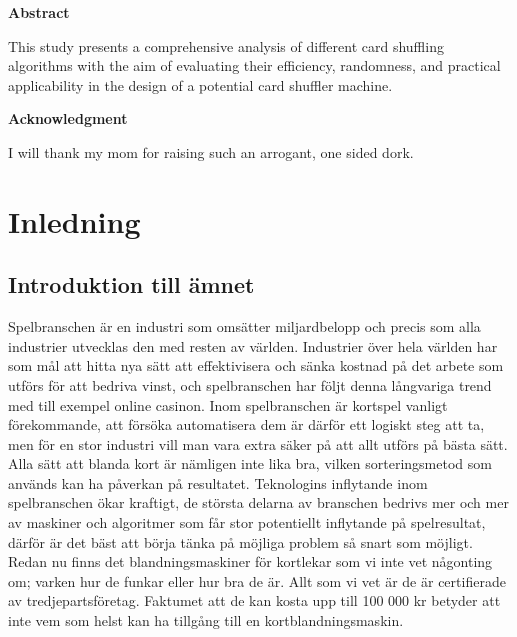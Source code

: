 \documentclass[swedish,a4paper]{article}
\begin{document}


\begin{center}
    \large
    \textbf{Abstract}
\end{center}
\vspace{0.5cm} 
\begin{adjustwidth}{2cm}{2cm} 
This study presents a comprehensive analysis of different card shuffling algorithms with the aim of evaluating their efficiency, randomness, and practical applicability in the design of a potential card shuffler machine.

\vspace{1cm} 
\begin{center}
    \large
    \textbf{Acknowledgment}
\end{center}
\vspace{0.5cm} 
I will thank my mom for raising such an arrogant, one sided dork.
\newpage

\end{adjustwidth}


\tableofcontents
\newpage

\glsaddall[] %
\printglossary[title=Ordlista] %
\newpage

\section{Inledning}
\subsection{Introduktion till ämnet}
Spelbranschen är en industri som omsätter miljardbelopp och precis som alla
industrier utvecklas den med resten av världen. Industrier över hela världen har
som mål att hitta nya sätt att effektivisera och sänka kostnad på det arbete som
utförs för att bedriva vinst, och spelbranschen har följt denna långvariga trend
med till exempel online casinon. Inom spelbranschen är kortspel vanligt
förekommande, att försöka automatisera dem är därför ett logiskt steg att ta, men för
en stor industri vill man vara extra säker på att allt utförs på bästa sätt.
Alla sätt att blanda kort är nämligen inte lika bra, vilken sorteringsmetod som
används kan ha påverkan på resultatet. Teknologins inflytande inom spelbranschen
ökar kraftigt, de största delarna av branschen bedrivs mer och mer av maskiner
och algoritmer som får stor potentiellt inflytande på spelresultat, därför är
det bäst att börja tänka på möjliga problem så snart som möjligt. Redan nu finns
det blandningsmaskiner för kortlekar som vi inte vet någonting om; varken hur de
funkar eller hur bra de är. Allt som vi vet är de är certifierade av
tredjepartsföretag. Faktumet att de kan kosta upp till 100 000 kr betyder att
inte vem som helst kan ha tillgång till en kortblandningsmaskin.
\end{document}
